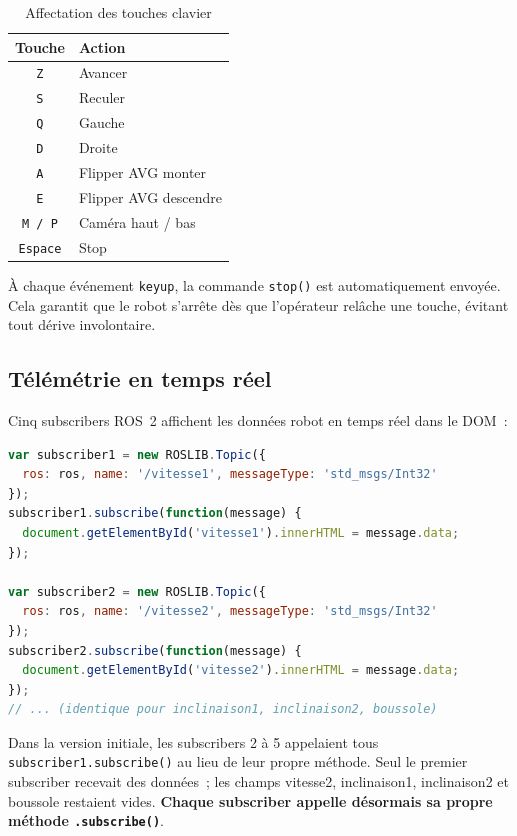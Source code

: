 \documentclass[12pt,a4paper]{report}
\begin{document}
\begin{table}[H]
\centering
\begin{tabular}{cl}
\toprule
\textbf{Touche} & \textbf{Action} \\
\midrule
\texttt{Z}       & Avancer \\
\texttt{S}       & Reculer \\
\texttt{Q}       & Gauche \\
\texttt{D}       & Droite \\
\texttt{A}       & Flipper AVG monter \\
\texttt{E}       & Flipper AVG descendre \\
\texttt{M / P}   & Caméra haut / bas \\
\texttt{Espace}  & Stop \\
\bottomrule
\end{tabular}
\caption{Affectation des touches clavier}
\end{table}

\begin{infobox}
À chaque événement \texttt{keyup}, la commande \texttt{stop()} est automatiquement envoyée. Cela garantit que le robot s'arrête dès que l'opérateur relâche une touche, évitant tout dérive involontaire.
\end{infobox}

\subsection{Télémétrie en temps réel}

Cinq subscribers ROS~2 affichent les données robot en temps réel dans le DOM~:

\begin{lstlisting}[language=JavaScript, caption={Subscriber correct — chaque variable reçoit ses propres données}]
var subscriber1 = new ROSLIB.Topic({
  ros: ros, name: '/vitesse1', messageType: 'std_msgs/Int32'
});
subscriber1.subscribe(function(message) {
  document.getElementById('vitesse1').innerHTML = message.data;
});

var subscriber2 = new ROSLIB.Topic({
  ros: ros, name: '/vitesse2', messageType: 'std_msgs/Int32'
});
subscriber2.subscribe(function(message) {
  document.getElementById('vitesse2').innerHTML = message.data;
});
// ... (identique pour inclinaison1, inclinaison2, boussole)
\end{lstlisting}

\begin{warnbox}
Dans la version initiale, les subscribers 2 à 5 appelaient tous \texttt{subscriber1.subscribe()} au lieu de leur propre méthode. Seul le premier subscriber recevait des données~; les champs vitesse2, inclinaison1, inclinaison2 et boussole restaient vides. \textbf{Chaque subscriber appelle désormais sa propre méthode \texttt{.subscribe()}}.
\end{warnbox}
\end{document}
